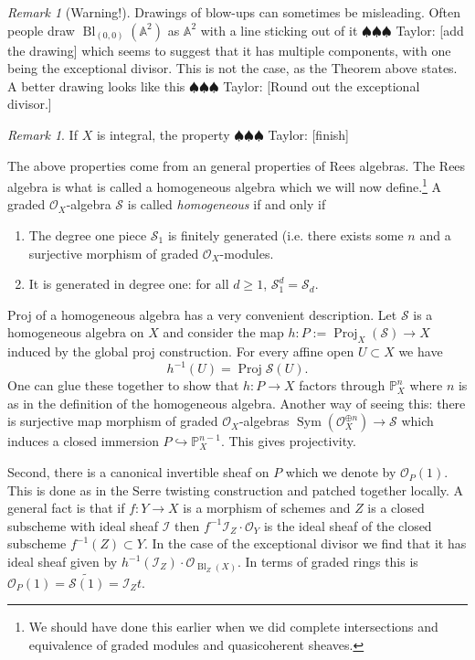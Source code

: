 \documentclass[12pt]{article}
\numberwithin{equation}{section}
\theoremstyle{definition}
\theoremstyle{remark}
\newtheorem{remark}[theorem]{Remark}
\newcommand{\Ocal}{\mathcal{O}}
\newcommand{\PP}{\mathbb{P}}
\renewcommand{\AA}{\mathbb{A}}
\newcommand{\Proj}{\operatorname{Proj}}
\newcommand{\Bl}{\operatorname{Bl}}
\newcommand{\Scal}{\mathcal{S}}
\newcommand{\Sym}{\operatorname{Sym}}
\newcommand{\Ical}{\mathcal{I}}
\newcommand{\taylor}[1]{{\color{blue} \sf $\spadesuit\spadesuit\spadesuit$ Taylor: [#1]}}
\begin{document}
\begin{remark}[Warning!]
	Drawings of blow-ups can sometimes be misleading. 
	Often people draw $\Bl_{(0,0)}(\AA^2)$ as $\AA^2$ with a line sticking out of it \taylor{add the drawing} which seems to suggest that it has multiple components, with one being the exceptional divisor. 
	This is not the case, as the Theorem above states. 
	A better drawing looks like this \taylor{Round out the exceptional divisor.}
\end{remark}

\begin{remark}
	If $X$ is integral, the property \taylor{finish}
\end{remark}

The above properties come from an general properties of Rees algebras.
The Rees algebra is what is called a homogeneous algebra which we will now define.\footnote{We should have done this earlier when we did complete intersections and equivalence of graded modules and quasicoherent sheaves.}
A graded $\Ocal_X$-algebra $\Scal$ is called \emph{homogeneous} if and only if 
	\begin{enumerate}
		\item The degree one piece $\Scal_1$ is finitely generated (i.e. there exists some $n$ and a surjective morphism of graded $\Ocal_X$-modules. 
		\item It is generated in degree one: for all $d\geq 1$, $\Scal_1^d = \Scal_d$. 
		\end{enumerate}
Proj of a homogeneous algebra has a very convenient description.
Let $\Scal$ is a homogeneous algebra on $X$ and consider the map $ h: P:=\Proj_X(\Scal) \to X $ induced by the global proj construction.
For every affine open $U\subset X$ we have 
\begin{equation}\label{eqn:inverse-image-blow}
 h^{-1}(U) = \Proj \Scal(U).
\end{equation}
One can glue these together to show that $h:P \to X$ factors through $\PP^n_X$ where $n$ is as in the definition of the homogeneous algebra. 
Another way of seeing this: there is surjective map morphism of graded $\Ocal_X$-algebras $\Sym(\Ocal_X^{\oplus n}) \to \Scal$ which induces a closed immersion $P \hookrightarrow \PP^{n-1}_X$.
This gives projectivity. 

Second, there is a canonical invertible sheaf on $P$ which we denote by $\Ocal_P(1)$. 
This is done as in the Serre twisting construction and patched together locally. 
A general fact is that if $f:Y\to X$ is a morphism of schemes and $Z$ is a closed subscheme with ideal sheaf $\Ical$ then $f^{-1}\Ical_Z \cdot \Ocal_Y$ is the ideal sheaf of the closed subscheme $f^{-1}(Z) \subset Y$. 
In the case of the exceptional divisor we find that it has ideal sheaf given by $h^{-1}(\Ical_Z)\cdot \Ocal_{\Bl_Z(X)}$.
In terms of graded rings this is $\Ocal_P(1)=\widetilde{\Scal(1)} = \Ical_Zt.$
\end{document}
